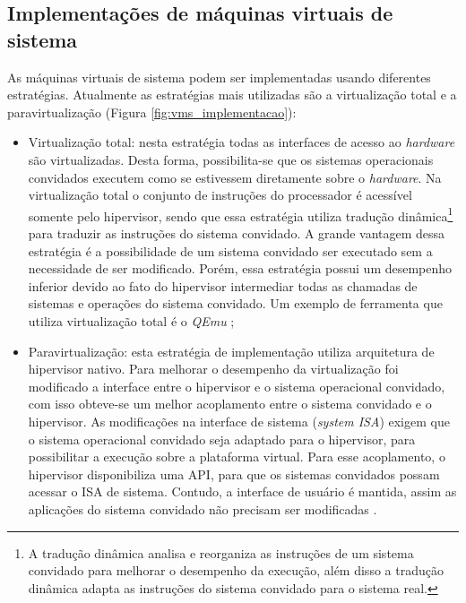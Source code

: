 

\subsection{Implementações de máquinas virtuais de sistema}
\label{section:virtestrat}

As máquinas virtuais de sistema podem ser implementadas usando diferentes estratégias. Atualmente as estratégias mais utilizadas
são a virtualização total e a paravirtualização (Figura \ref{fig:vms_implementacao}):
\begin{itemize}
 \item Virtualização total: nesta estratégia todas as interfaces de acesso ao \textit{hardware} são virtualizadas. Desta forma, possibilita-se 
 que os sistemas operacionais convidados executem como se estivessem diretamente sobre o \textit{hardware}. Na virtualização total o conjunto de 
 instruções do processador é acessível somente pelo hipervisor, sendo que essa estratégia utiliza tradução dinâmica\footnote{A tradução dinâmica 
 analisa e reorganiza as instruções de um sistema convidado para melhorar o desempenho da execução, além disso a tradução dinâmica adapta as 
 instruções do sistema convidado para o sistema real.} para traduzir as instruções do sistema convidado. A grande vantagem dessa estratégia é a 
 possibilidade de um sistema convidado ser executado sem a necessidade de ser modificado. Porém, essa estratégia possui um desempenho inferior 
 devido ao fato do hipervisor intermediar todas as chamadas de sistemas e operações do sistema convidado. Um exemplo de ferramenta que utiliza 
 virtualização total é o \textit{QEmu} \cite{qemu};
 \item Paravirtualização: esta estratégia de implementação utiliza arquitetura de hipervisor nativo. Para melhorar o desempenho da virtualização
 foi modificado a interface entre o hipervisor e o sistema operacional convidado, com isso obteve-se um melhor acoplamento entre o sistema
 convidado e o hipervisor. As modificações na interface de sistema (\textit{system \ac{ISA}}) exigem que o sistema operacional convidado seja
 adaptado para o hipervisor, para possibilitar a execução sobre a plataforma virtual. Para esse acoplamento, o hipervisor disponibiliza uma
 \ac{API}, para que os sistemas convidados possam acessar o \ac{ISA} de sistema. Contudo, a interface de usuário é mantida, assim as aplicações
 do sistema convidado não precisam ser modificadas \cite{maziero2013}.
\end{itemize}

